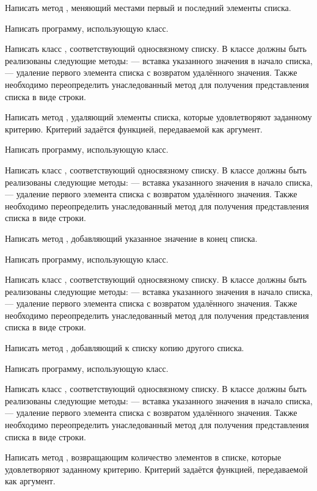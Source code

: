Написать метод , меняющий местами первый и последний
элементы списка.

Написать программу, использующую класс.

\task Написать класс , соответствующий
односвязному списку. В классе должны быть реализованы следующие
методы:  — вставка указанного значения в начало списка,
 — удаление первого элемента списка с возвратом удалённого
значения.  Также необходимо переопределить унаследованный метод
 для получения представления списка в виде строки.

Написать метод , удаляющий элементы списка, которые
удовлетворяют заданному критерию. Критерий задаётся функцией,
передаваемой как аргумент.

Написать программу, использующую класс.

\task Написать класс , соответствующий
односвязному списку. В классе должны быть реализованы следующие
методы:  — вставка указанного значения в начало списка,
 — удаление первого элемента списка с возвратом удалённого
значения.  Также необходимо переопределить унаследованный метод
 для получения представления списка в виде строки.

Написать метод , добавляющий указанное значение в конец
списка.

Написать программу, использующую класс.

\task Написать класс , соответствующий
односвязному списку. В классе должны быть реализованы следующие
методы:  — вставка указанного значения в начало списка,
 — удаление первого элемента списка с возвратом удалённого
значения.  Также необходимо переопределить унаследованный метод
 для получения представления списка в виде строки.

Написать метод , добавляющий к списку копию другого
списка.

Написать программу, использующую класс.

\task Написать класс , соответствующий
односвязному списку. В классе должны быть реализованы следующие
методы:  — вставка указанного значения в начало списка,
 — удаление первого элемента списка с возвратом удалённого
значения.  Также необходимо переопределить унаследованный метод
 для получения представления списка в виде строки.

Написать метод , возвращающим количество элементов в
списке, которые удовлетворяют заданному критерию. Критерий задаётся
функцией, передаваемой как аргумент.

